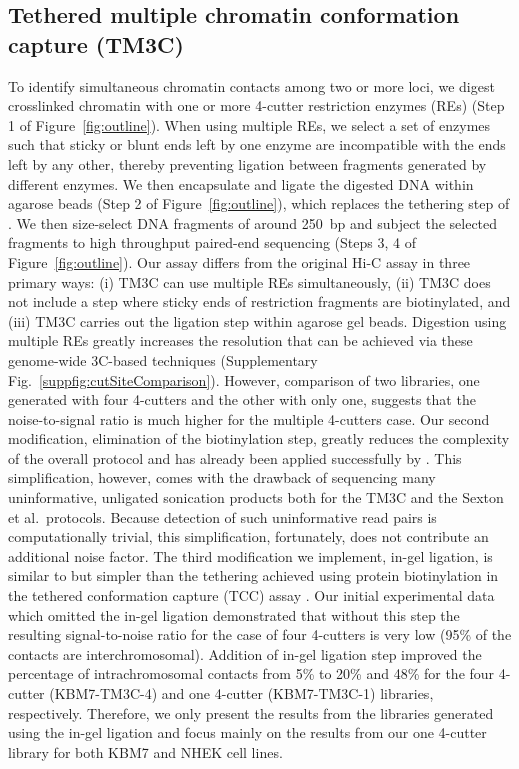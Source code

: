 \subsection*{Tethered multiple chromatin conformation capture (TM3C)}
To identify simultaneous chromatin contacts among two or more loci,
we digest crosslinked chromatin with one or more 4-cutter restriction
enzymes (REs) (Step 1 of Figure~\ref{fig:outline}). When using multiple
REs, we select a set of enzymes such that sticky or blunt ends left by one
enzyme are incompatible with the ends left by any other, thereby preventing
ligation between fragments generated by different enzymes. We then encapsulate
and ligate the digested DNA within agarose beads
(Step 2 of Figure~\ref{fig:outline}), which replaces the tethering step of
\citet{kalhor:genome}. We then size-select DNA fragments of around 250~bp
and subject the selected fragments to high throughput paired-end sequencing
(Steps 3, 4 of Figure~\ref{fig:outline}). Our assay differs from the original
Hi-C assay in three primary ways: (i) TM3C can use multiple REs simultaneously,
(ii) TM3C does not include a step where sticky ends of restriction fragments
are biotinylated, and (iii) TM3C carries out the ligation step within agarose
gel beads. Digestion using multiple REs greatly increases the resolution that
can be achieved via these genome-wide 3C-based techniques
(Supplementary Fig.~\ref{suppfig:cutSiteComparison}). However, comparison of
two libraries, one generated with four 4-cutters and the other with only one,
suggests that the noise-to-signal ratio is much higher for the multiple 4-cutters case.
Our second modification, elimination of the biotinylation step, greatly reduces
the complexity of the overall protocol and has already been applied successfully by
\citet{sexton:three-dimensional}. This simplification, however,
comes with the drawback of sequencing many uninformative, unligated sonication
products both for the TM3C and the Sexton et al.\ protocols. Because detection of
such uninformative read pairs is computationally trivial, this simplification,
fortunately, does not contribute an additional noise factor. The third
modification we implement, in-gel ligation, is similar to but simpler
than the tethering achieved
using protein biotinylation in the tethered conformation capture (TCC)
assay \citep{kalhor:genome}. Our initial experimental data which omitted
the in-gel ligation demonstrated that without this step the resulting
signal-to-noise ratio for the case of four 4-cutters is very low
(95\% of the contacts are interchromosomal). Addition of in-gel ligation step
improved the percentage of intrachromosomal contacts from 5\% to 20\% and
48\% for the four 4-cutter (KBM7-TM3C-4) and one 4-cutter (KBM7-TM3C-1)
libraries, respectively. Therefore, we only present the results from the
libraries generated using the in-gel ligation and focus mainly on the
results from our one 4-cutter library for both KBM7 and NHEK cell lines.

